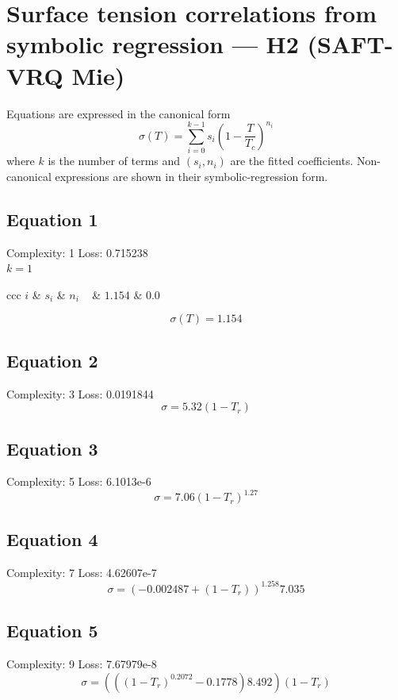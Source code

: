 \documentclass[11pt]{article}
\begin{document}
\section*{Surface tension correlations from symbolic regression — H2 (SAFT-VRQ Mie)}
\noindent Equations are expressed in the canonical form
\[
  \sigma(T) = \sum_{i=0}^{k-1} s_i \left(1 - \frac{T}{T_c}\right)^{\!n_i}
\]
where $k$ is the number of terms and $(s_i, n_i)$ are the fitted coefficients.
Non-canonical expressions are shown in their symbolic-regression form.

\subsection*{Equation 1}
\noindent Complexity: 1 \quad Loss: 0.715238 \\[4pt]
\noindent $k = 1$ \\[2pt]
\begin{center}
\begin{tabular}{ccc}
\toprule
$i$ & $s_i$ & $n_i$ \
 & $1.154$ & $0.0$ \\
\bottomrule
\end{tabular}
\end{center}
\[
\sigma(T) = 1.154
\]

\subsection*{Equation 2}
\noindent Complexity: 3 \quad Loss: 0.0191844 \\[4pt]
\[
\sigma = 5.32 (1 - T_r)
\]

\subsection*{Equation 3}
\noindent Complexity: 5 \quad Loss: 6.1013e-6 \\[4pt]
\[
\sigma = 7.06 \left(1 - T_r\right)^{1.27}
\]

\subsection*{Equation 4}
\noindent Complexity: 7 \quad Loss: 4.62607e-7 \\[4pt]
\[
\sigma = \left(-0.002487 + (1 - T_r)\right)^{1.258} 7.035
\]

\subsection*{Equation 5}
\noindent Complexity: 9 \quad Loss: 7.67979e-8 \\[4pt]
\[
\sigma = ((\left(1 - T_r\right)^{0.2072} - 0.1778) 8.492) (1 - T_r)
\]
\end{document}
